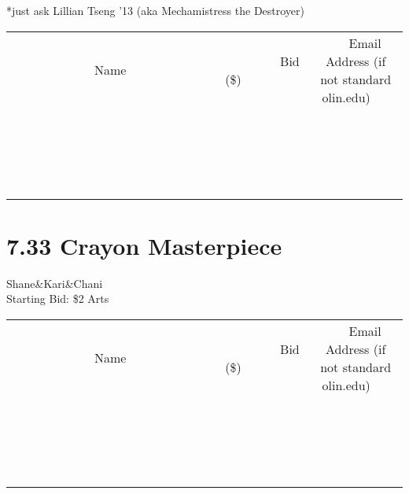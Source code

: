 \documentclass[11pt]{article}
\begin{document}
*just ask Lillian Tseng ’13 (aka Mechamistress the Destroyer)
\\[3ex]
\begin{tabular}{c c c}
~~~~~~~~~~~~~Name~~~~~~~~~~~~~ & ~~~~~~~~~Bid (\$)~~~~~~~~~  & ~~~Email Address (if not standard olin.edu)~~~\\
 & & \\
\hline
 & & \\
\hline
 & & \\
\hline
 & & \\
\hline
 & & \\
\hline
 & & \\
\hline
 & & \\
\hline
 & & \\
\hline
 & & \\
\hline
 & & \\
\hline
 & & \\
\hline
 & & \\
\hline
 & & \\
\hline
 & & \\
\hline
 & & \\
\hline
 & & \\
\hline
 & & \\
\hline
 & & \\
\hline
 & & \\
\hline
\end{tabular}
\newpage
\section*{7.33 Crayon Masterpiece}
Shane\&Kari\&Chani
\\
Starting Bid: \$2
\newline
Arts
\\[3ex]
\begin{tabular}{c c c}
~~~~~~~~~~~~~Name~~~~~~~~~~~~~ & ~~~~~~~~~Bid (\$)~~~~~~~~~  & ~~~Email Address (if not standard olin.edu)~~~\\
 & & \\
\hline
 & & \\
\hline
 & & \\
\hline
 & & \\
\hline
 & & \\
\hline
 & & \\
\hline
 & & \\
\hline
 & & \\
\hline
 & & \\
\hline
 & & \\
\hline
 & & \\
\hline
 & & \\
\hline
 & & \\
\hline
 & & \\
\hline
 & & \\
\hline
 & & \\
\hline
 & & \\
\hline
 & & \\
\hline
 & & \\
\hline
\end{tabular}
\newpage
\end{document}
